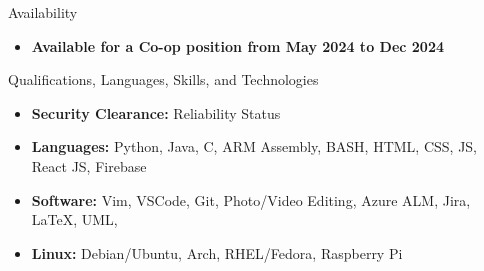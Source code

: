 \documentclass[]{mcdowellcv}
\begin{document}
	\makeheader

	\begin{cvsection}{Availability}
		\begin{cvsubsection}{}{}{}
			\begin{itemize}
				\item \textbf{Available for a Co-op position from May 2024 to Dec 2024}
			\end{itemize}
		\end{cvsubsection}
	\end{cvsection}

	\begin{cvsection}{Qualifications, Languages, Skills, and Technologies}
		\begin{cvsubsection}{}{}{}	
			\begin{itemize}
					\item \textbf{Security Clearance:} Reliability Status
					\item \textbf{Languages:} Python, Java, C, ARM Assembly, BASH, HTML, CSS, JS, React JS, Firebase
					\item \textbf{Software:} Vim, VSCode, Git, Photo/Video Editing, Azure ALM, Jira, \LaTeX, UML,
					\item \textbf{Linux:} Debian/Ubuntu, Arch, RHEL/Fedora, Raspberry Pi 
			\end{itemize}
		\end{cvsubsection}
	\end{cvsection}
\end{document}
